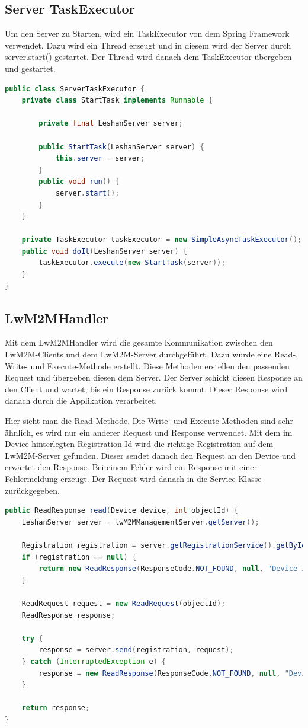 \subsection{Server TaskExecutor}
Um den Server zu Starten, wird ein TaskExecutor von dem Spring Framework verwendet. Dazu wird ein Thread erzeugt und in diesem wird der Server durch server.start() gestartet. Der Thread wird danach dem TaskExecutor übergeben und gestartet.
\begin{lstlisting}[language=java]
public class ServerTaskExecutor {
	private class StartTask implements Runnable {

		private final LeshanServer server;

		public StartTask(LeshanServer server) {
			this.server = server;
		}
		public void run() {
			server.start();
		}
	}

	private TaskExecutor taskExecutor = new SimpleAsyncTaskExecutor();
	public void doIt(LeshanServer server) {
		taskExecutor.execute(new StartTask(server));
	}
}
\end{lstlisting}

\subsection{LwM2MHandler}
Mit dem LwM2MHandler wird die gesamte Kommunikation zwischen den LwM2M-Clients und dem LwM2M-Server durchgeführt. Dazu wurde eine Read-, Write- und Execute-Methode  erstellt. Diese Methoden erstellen den passenden Request und übergeben diesen dem Server. Der Server schickt diesen Response an den Client und wartet, bis ein Response zurück kommt. Dieser Response wird danach durch die Applikation verarbeitet. 

Hier sieht man die Read-Methode. Die Write- und Execute-Methoden sind sehr ähnlich, es wird nur ein anderer Request und Response verwendet. Mit dem im Device hinterlegten Registration-Id wird die richtige Registration auf dem LwM2M-Server gefunden. Dieser sendet danach den Request an den Device und erwartet den Response. Bei einem Fehler wird ein Response mit einer Fehlermeldung erzeugt. Der Request wird danach in die Service-Klasse zurückgegeben.
\begin{lstlisting}[language=java]
public ReadResponse read(Device device, int objectId) {
	LeshanServer server = lwM2MManagementServer.getServer();

	Registration registration = server.getRegistrationService().getById(device.getRegId());
	if (registration == null) {
		return new ReadResponse(ResponseCode.NOT_FOUND, null, "Device is not reachable");
	}

	ReadRequest request = new ReadRequest(objectId);
	ReadResponse response;

	try {
		response = server.send(registration, request);
	} catch (InterruptedException e) {
		response = new ReadResponse(ResponseCode.NOT_FOUND, null, "Device is not reachable");
	}

	return response;
}
\end{lstlisting}

